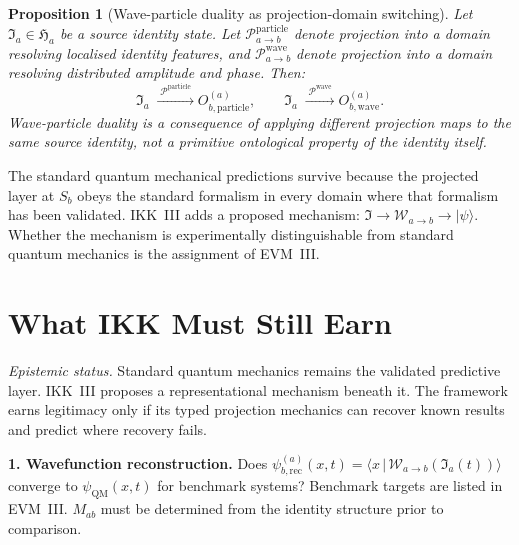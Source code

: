 \documentclass[12pt, a4paper]{article}
\theoremstyle{definition}
\theoremstyle{plain}
\newtheorem{prop}{Proposition}[section]
\theoremstyle{remark}
\newenvironment{epistemic}
  {\medskip\noindent\textit{Epistemic status.}\enspace}{\medskip}
\newenvironment{evidenceitem}[1]
  {\medskip\noindent\textbf{#1.}\enspace}{\medskip}
\newcommand{\Ia}{\mathfrak{I}_a}
\newcommand{\II}{\mathfrak{I}}
\newcommand{\Ha}{\mathfrak{H}_a}        %
\newcommand{\Sb}{S_b}
\newcommand{\Pab}{\mathcal{P}_{a\to b}}
\newcommand{\Wab}{\mathcal{W}_{a\to b}}   %
\newcommand{\psirec}{\psi_{b,\mathrm{rec}}^{(a)}}
\newcommand{\psiQM}{\psi_{\mathrm{QM}}}
\newcommand{\Mab}{M_{ab}}
\begin{document}
\begin{prop}[Wave-particle duality as projection-domain switching]
\label{prop:duality}
Let $\Ia \in \Ha$ be a source identity state.
Let $\Pab^{\mathrm{particle}}$ denote projection into a domain
resolving localised identity features, and
$\Pab^{\mathrm{wave}}$ denote projection into a domain resolving
distributed amplitude and phase.
Then:
\[
  \Ia
  \;\xrightarrow{\;\mathcal{P}^{\mathrm{particle}}\;}
  O_{b,\mathrm{particle}}^{(a)},
  \qquad
  \Ia
  \;\xrightarrow{\;\mathcal{P}^{\mathrm{wave}}\;}
  O_{b,\mathrm{wave}}^{(a)}.
\]
Wave-particle duality is a consequence of applying different
projection maps to the same source identity, not a primitive
ontological property of the identity itself.
\end{prop}

\begin{center}
\end{center}

The standard quantum mechanical predictions survive because the
projected layer at $\Sb$ obeys the standard formalism in every
domain where that formalism has been validated.
IKK~III adds a proposed mechanism: $\II \to \Wab \to |\psi\rangle$.
Whether the mechanism is experimentally distinguishable from
standard quantum mechanics is the assignment of EVM~III.


\section{What IKK Must Still Earn}
\label{sec:debt}

\begin{epistemic}
Standard quantum mechanics remains the validated predictive layer.
IKK~III proposes a representational mechanism beneath it.
The framework earns legitimacy only if its typed projection mechanics
can recover known results and predict where recovery fails.
\end{epistemic}

\begin{evidenceitem}{1. Wavefunction reconstruction}
Does $\psirec(x,t) = \langle x\,|\,\Wab(\Ia(t))\rangle$
converge to $\psiQM(x,t)$ for benchmark systems?
Benchmark targets are listed in EVM~III.
$\Mab$ must be determined from the identity structure prior to
comparison.
\end{evidenceitem}
\end{document}
